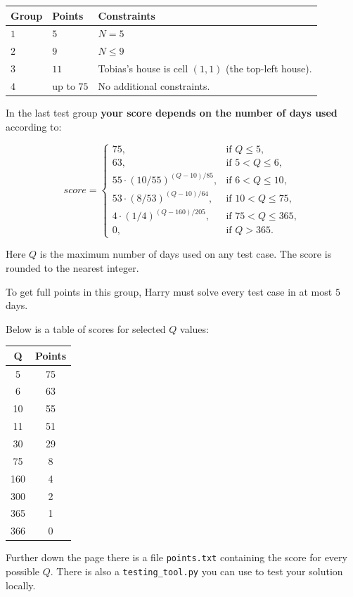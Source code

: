 \noindent
\begin{tabular}{| l | l | p{12cm} |}
  \hline
  \textbf{Group} & \textbf{Points} & \textbf{Constraints} \\ \hline
  $1$ & $5$  & $N = 5$ \\ \hline
  $2$ & $9$  & $N \le 9$ \\ \hline
  $3$ & $11$ & Tobias's house is cell $(1,1)$ (the top-left house). \\ \hline
  $4$ & up to $75$ & No additional constraints. \\ \hline
\end{tabular}

In the last test group \textbf{your score depends on the number of days used} according to:

\[
score =
\begin{cases}
75, & \text{if } Q \le 5,\\
63, & \text{if } 5 < Q \le 6,\\
55 \cdot \left( 10/55 \right)^{ (Q-10)/85}, & \text{if } 6 < Q \le 10,\\
53 \cdot \left( 8/53 \right)^{ (Q-10)/64}, & \text{if } 10 < Q \le 75,\\
4  \cdot \left( 1/4 \right)^{ (Q-160)/205}, & \text{if } 75 < Q \le 365,\\
0, & \text{if } Q > 365.
\end{cases}
\]

Here $Q$ is the maximum number of days used on any test case. The score is rounded to the nearest integer.

To get full points in this group, Harry must solve every test case in at most $5$ days.

Below is a table of scores for selected $Q$ values:
\begin{table}[h!]
\centering
\begin{tabular}{c|c}
\textbf{Q} & \textbf{Points} \\
\hline
5   & 75 \\
6   & 63 \\
10  & 55 \\
11  & 51 \\
30  & 29 \\
75  & 8 \\
160 & 4 \\
300 & 2 \\
365 & 1 \\
366 & 0 \\
\end{tabular}
\end{table}

Further down the page there is a file \texttt{points.txt} containing the score for every possible $Q$.
There is also a \texttt{testing\_tool.py} you can use to test your solution locally.

